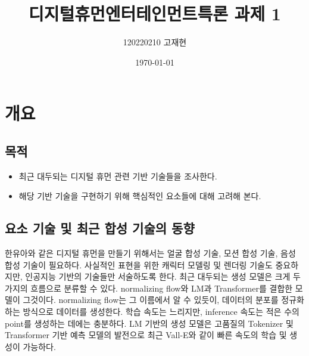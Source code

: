 \documentclass[
	9pt,
	a4paper,
	figtabcapt,
]{oblivoir}
\title{\vspace{-4cm}디지털휴먼엔터테인먼트특론 과제 1}
\author{120220210 고재현}
\date{\today}
\begin{document}


\maketitle





\setcounter{table}{0}		                    %
\setcounter{figure}{0}		                    %




\section{개요}{\label{sec:intro}}

\subsection{목적}
\begin{itemize}\tightlist
    \item 최근 대두되는 디지털 휴먼 관련 기반 기술들을 조사한다.
    \item 해당 기반 기술을 구현하기 위해 핵심적인 요소들에 대해 고려해 본다.
\end{itemize}

\subsection{요소 기술 및 최근 합성 기술의 동향}
한유아와 같은 디지털 휴먼을 만들기 위해서는 얼굴 합성 기술, 모션 합성 기술, 음성 합성 기술이 필요하다.
사실적인 표현을 위한 캐릭터 모델링 및 렌더링 기술도 중요하지만, 인공지능 기반의 기술들만 서술하도록 한다.
최근 대두되는 생성 모델은 크게 두 가지의 흐름으로 분류할 수 있다.
normalizing flow와 LM과 Transformer를 결합한 모델이 그것이다.
normalizing flow는 그 이름에서 알 수 있듯이, 데이터의 분포를 정규화하는 방식으로 데이터를 생성한다.
학습 속도는 느리지만, inference 속도는 적은 수의 point를 생성하는 데에는 충분하다\cite{TFGMT2022}.
LM 기반의 생성 모델은 고품질의 Tokenizer 및 Transformer 기반 예측 모델의 발전으로
최근 Vall-E\cite{vall-eX}와 같이 빠른 속도의 학습 및 생성이 가능하다.
\end{document}
